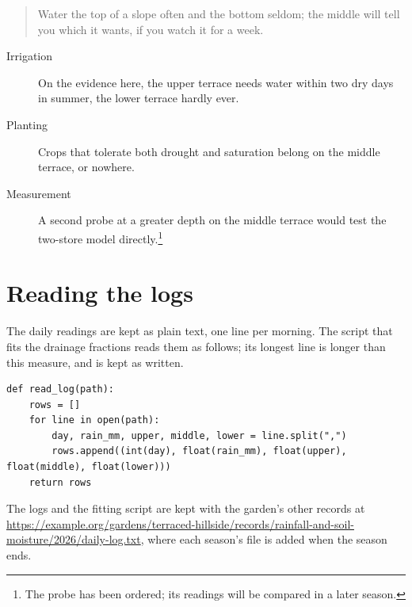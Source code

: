 \documentclass{article}
\begin{document}
\begin{quote}
Water the top of a slope often and the bottom seldom; the middle will
tell you which it wants, if you watch it for a week.
\end{quote}

\begin{description}
  \item[Irrigation] On the evidence here, the upper terrace needs water
  within two dry days in summer, the lower terrace hardly ever.
  \item[Planting] Crops that tolerate both drought and saturation belong
  on the middle terrace, or nowhere.
  \item[Measurement] A second probe at a greater depth on the middle
  terrace would test the two-store model directly.\footnote{The probe
  has been ordered; its readings will be compared in a later season.}
\end{description}

\appendix

\section{Reading the logs}

The daily readings are kept as plain text, one line per morning. The
script that fits the drainage fractions reads them as follows; its longest
line is longer than this measure, and is kept as written.

\begin{verbatim}
def read_log(path):
    rows = []
    for line in open(path):
        day, rain_mm, upper, middle, lower = line.split(",")
        rows.append((int(day), float(rain_mm), float(upper), float(middle), float(lower)))
    return rows
\end{verbatim}

The logs and the fitting script are kept with the garden's other records at
\url{https://example.org/gardens/terraced-hillside/records/rainfall-and-soil-moisture/2026/daily-log.txt},
where each season's file is added when the season ends.
\end{document}
